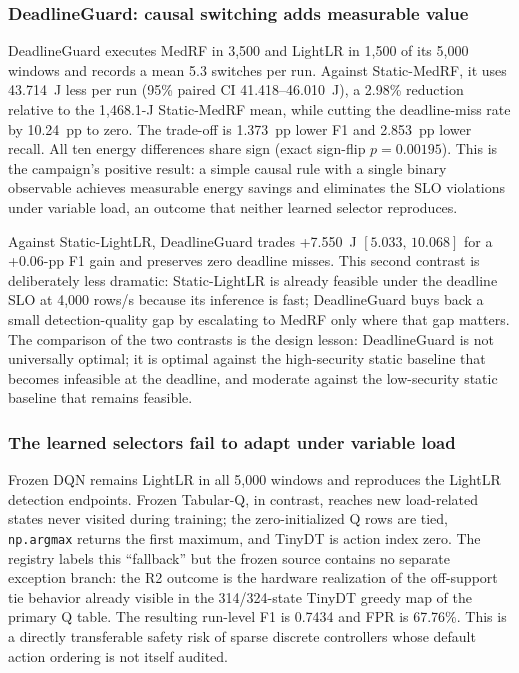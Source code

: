 \begin{table}[t]
\centering\scriptsize
\caption{Headline R2 paired contrasts, $n=10$ blocks. $\Delta E$ is first-minus-second method; detection and deadline changes are percentage points.}
\label{tab:r2pairs}
\end{table}

\subsubsection*{DeadlineGuard: causal switching adds measurable value}
DeadlineGuard executes MedRF in 3{,}500 and LightLR in 1{,}500 of its 5{,}000 windows and records a mean 5.3 switches per run. Against Static-MedRF, it uses 43.714~J less per run (95\% paired CI 41.418--46.010~J), a 2.98\% reduction relative to the 1{,}468.1-J Static-MedRF mean, while cutting the deadline-miss rate by 10.24~pp to zero. The trade-off is 1.373~pp lower F1 and 2.853~pp lower recall. All ten energy differences share sign (exact sign-flip $p=0.00195$). This is the campaign's positive result: a simple causal rule with a single binary observable achieves measurable energy savings and eliminates the SLO violations under variable load, an outcome that neither learned selector reproduces.

Against Static-LightLR, DeadlineGuard trades +7.550~J $[5.033,\,10.068]$ for a +0.06-pp F1 gain and preserves zero deadline misses. This second contrast is deliberately less dramatic: Static-LightLR is already feasible under the deadline SLO at 4{,}000 rows/s because its inference is fast; DeadlineGuard buys back a small detection-quality gap by escalating to MedRF only where that gap matters. The comparison of the two contrasts is the design lesson: DeadlineGuard is not universally optimal; it is optimal against the high-security static baseline that becomes infeasible at the deadline, and moderate against the low-security static baseline that remains feasible.

\subsubsection*{The learned selectors fail to adapt under variable load}
Frozen DQN remains LightLR in all 5{,}000 windows and reproduces the LightLR detection endpoints. Frozen Tabular-Q, in contrast, reaches new load-related states never visited during training; the zero-initialized Q rows are tied, \texttt{np.argmax} returns the first maximum, and TinyDT is action index zero. The registry labels this ``fallback'' but the frozen source contains no separate exception branch: the R2 outcome is the hardware realization of the off-support tie behavior already visible in the 314/324-state TinyDT greedy map of the primary Q table. The resulting run-level F1 is 0.7434 and FPR is 67.76\%. This is a directly transferable safety risk of sparse discrete controllers whose default action ordering is not itself audited.

